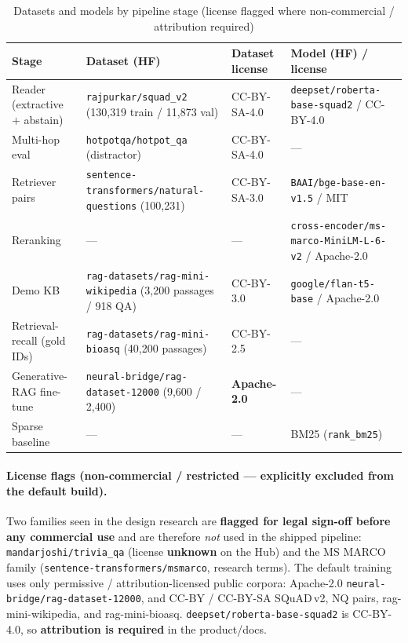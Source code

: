 \documentclass[12pt,a4paper]{article}
\begin{document}
\begin{table}[H]
\centering
\caption{Datasets and models by pipeline stage (license flagged where non-commercial / attribution required)}
\scriptsize
\setlength{\tabcolsep}{4pt}
\begin{tabularx}{\linewidth}{@{} l L l l @{}}
\toprule
\textbf{Stage} & \textbf{Dataset (HF)} & \textbf{Dataset license} & \textbf{Model (HF) / license} \\
\midrule
Reader (extractive $+$ abstain) & \texttt{rajpurkar/squad\_v2} (130{,}319 train / 11{,}873 val) & CC-BY-SA-4.0 & \texttt{deepset/roberta-base-squad2} / CC-BY-4.0 \\
Multi-hop eval & \texttt{hotpotqa/hotpot\_qa} (distractor) & CC-BY-SA-4.0 & --- \\
Retriever pairs & \texttt{sentence-transformers/natural-questions} (100{,}231) & CC-BY-SA-3.0 & \texttt{BAAI/bge-base-en-v1.5} / MIT \\
Reranking & --- & --- & \texttt{cross-encoder/ms-marco-MiniLM-L-6-v2} / Apache-2.0 \\
Demo KB & \texttt{rag-datasets/rag-mini-wikipedia} (3{,}200 passages / 918 QA) & CC-BY-3.0 & \texttt{google/flan-t5-base} / Apache-2.0 \\
Retrieval-recall (gold IDs) & \texttt{rag-datasets/rag-mini-bioasq} (40{,}200 passages) & CC-BY-2.5 & --- \\
Generative-RAG fine-tune & \texttt{neural-bridge/rag-dataset-12000} (9{,}600 / 2{,}400) & \textbf{Apache-2.0} & --- \\
Sparse baseline & --- & --- & BM25 (\texttt{rank\_bm25}) \\
\bottomrule
\end{tabularx}
\end{table}

\paragraph{License flags (non-commercial / restricted --- explicitly excluded from the default build).} Two families seen in the design research are \textbf{flagged for legal sign-off before any commercial use} and are therefore \emph{not} used in the shipped pipeline: \texttt{mandarjoshi/trivia\_qa} (license \textbf{unknown} on the Hub) and the MS MARCO family (\texttt{sentence-transformers/msmarco}, research terms). The default training uses only permissive / attribution-licensed public corpora: Apache-2.0 \texttt{neural-bridge/rag-dataset-12000}, and CC-BY / CC-BY-SA SQuAD\,v2, NQ pairs, rag-mini-wikipedia, and rag-mini-bioasq. \texttt{deepset/roberta-base-squad2} is CC-BY-4.0, so \textbf{attribution is required} in the product/docs.
\end{document}
